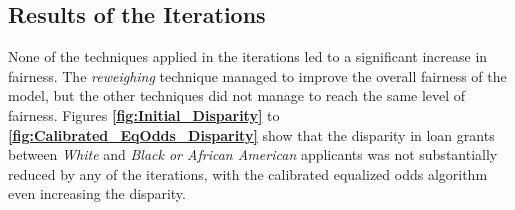 \subsection{Results of the Iterations}\label{subsec:Iterations}

None of the techniques applied in the iterations led to a significant increase in fairness. The \textit{reweighing} technique managed to improve the overall fairness of the model, but the other techniques did not manage to reach the same level of fairness. 
Figures \textbf{\ref{fig:Initial_Disparity}} to \textbf{\ref{fig:Calibrated_EqOdds_Disparity}} show that the disparity in loan grants between \textit{White} and \textit{Black or African American} applicants was not substantially reduced by any of the iterations, with the calibrated equalized odds algorithm even increasing the disparity.

